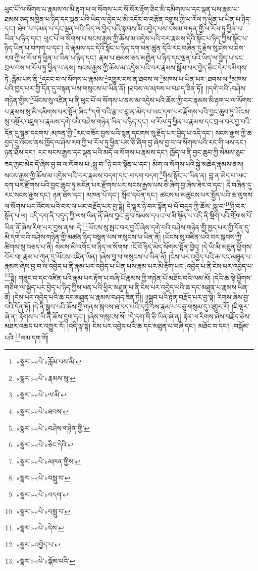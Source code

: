 ཕུང་པོ་ལ་སོགས་པ་རྣམས་ལ་མི་རྟག་པ་ལ་སོགས་པར་སོ་སོར་རྟོག་ཅིང་མི་དམིགས་པ་དང་ལྡན་པས་རྣམ་པ་ཐམས་ཅད་མཁྱེན་པ་ཉིད་དང་ལྡན་པའི་ཡིད་ལ་བྱེད་པ་མི་འདོར་བ་བརྩོན་འགྲུས་ཀྱི་ཕ་རོལ་ཏུ་ཕྱིན་པ་ཡིན་པ་ཉིད་དང་། ཐེག་པ་དམན་པ་དང་ལྡན་པའི་ཡིད་ལ་བྱེད་པའི་སྐབས་མི་འབྱེད་པས་བསམ་གཏན་གྱི་ཕ་རོལ་ཏུ་ཕྱིན་པ་ཡིན་པ་ཉིད་དང་། ཕུང་པོ་ལ་སོགས་པ་སངས་རྒྱས་ཀྱི་ཆོས་མ་འདྲེས་པའི་བར་རྣམས་དེའི་སྟོང་པ་ཉིད་ཀྱིས་སྟོང་པ་ཉིད་ཡིན་པ་བཀག་པ་དང་། དེ་རྣམས་དང་དེའི་སྟོང་པ་ཉིད་དག་ཕན་ཚུན་དེའི་རང་བཞིན་དུ་རྗེས་སུ་ཤེས་པ་ཤེས་རབ་ཀྱི་ཕ་རོལ་ཏུ་ཕྱིན་པ་ཡིན་པ་ཉིད་དང་། རྣམ་པ་ཐམས་ཅད་མཁྱེན་པ་ཉིད་དང་ལྡན་པའི་ཡིད་ལ་བྱེད་པ་དང་བྲལ་བས་ཕ་རོལ་ཏུ་ཕྱིན་པ་ནས། སངས་རྒྱས་ཀྱི་ཆོས་མ་འདྲེས་པའི་བར་རྣམས་སྒོམ་པར་བྱེད་ཅིང་དེར་དམིགས་ཏེ་:རློམ་པས་ནི་\footnote{«སྣར་»«པེ་»རློམ་པས་མི་}དངང་བ་ལ་སོགས་པ་རྣམས་\footnote{«སྣར་»«པེ་»རྣམས་སུ་}འགྱུར་བས་ན་ཐབས་ལ་\footnote{«སྣར་»«པེ་»ལ་མི་}མཁས་པ་ཡིན་པར་:ཐབས་ལ་\footnote{«སྣར་»«པེ་»ཐབས་}མཁས་པའི་ཁྱད་པར་གྱི་དོན་དུ་བསྟན་པས་གསུངས་པ་ཡིན་ནོ། །ཐབས་ལ་མཁས་པ་བཤད་ཟིན་ཏོ།། །།དགེ་བའི་:བཤེས་གཉེན་གྱིས་\footnote{«སྣར་»«པེ་»བཤེས་གཉེན་གྱི་}ཡོངས་སུ་འཛིན་པ་ནི་ཕུང་པོ་ལ་སོགས་པ་ནས་མ་འདྲེས་པའི་ཆོས་ཀྱི་བར་རྣམས་མི་རྟག་པ་ལ་སོགས་པ་རྣམས་སུ་མི་དམིགས་པར་སྟོན་ཞིང་\footnote{«སྣར་»«པེ་»ཅིང་དེའི་}དགེ་བའི་རྩ་བ་བླ་ན་མེད་པ་ཡང་དག་པར་རྫོགས་པའི་བྱང་ཆུབ་ཏུ་ཡོངས་སུ་བསྔོར་འཇུག་པ་རྣམས་དགེ་བའི་བཤེས་གཉེན་ཡིན་པ་ཉིད་དང་། ཕ་རོལ་ཏུ་ཕྱིན་པ་རྣམས་དང་བྲལ་བར་བྱ་བའི་དོན་དུ་སྙན་དངགས་:མཁན་གྱི་\footnote{«སྣར་»«པེ་»མཁན་གྱིས་}རང་བཟོར་བྱས་པའི་སྙན་དངགས་སུ་རྗོད་པར་བྱེད་པ་འདི་དང་། སངས་རྒྱས་ཀྱི་ཆ་བྱད་དུ་འོངས་ནས་ཁྱོད་ལ་ཤེས་རབ་ཀྱི་ཕ་རོལ་ཏུ་ཕྱིན་པས་ཅི་ཞིག་བྱ་ཞེས་བྱ་བ་ལ་སོགས་པའི་རང་གི་ལས་དང་། ཉན་ཐོས་དང་། རང་སངས་རྒྱས་དང་ལྡན་པའི་མདོ་ལ་སོགས་པ་རྣམས་དང་། ཁྱོད་ལ་ནི་བྱང་ཆུབ་ཀྱི་སེམས་ཅུང་ཟད་ཀྱང་མེད་དོ་ཞེས་བྱ་བ་ལ་སོགས་པ་:སླུ་བ་\footnote{«སྣར་»«པེ་»བསླུ་བ་}ཉེ་བར་སྟོན་པ་དང་། མིག་ལ་སོགས་པའི་སྐྱེ་མཆེད་རྣམས་ནས། སངས་རྒྱས་ཀྱི་ཆོས་མ་འདྲེས་པའི་བར་རྣམས་བདག་དང་:བདག་བདག་\footnote{«སྣར་»«པེ་»བདག་}གིས་སྟོང་པ་ཡིན་ན། བླ་ན་མེད་པ་ཡང་དག་པར་རྫོགས་པའི་བྱང་ཆུབ་ཏུ་མངོན་པར་རྫོགས་པར་སངས་རྒྱས་པས་ཅི་ཞིག་བྱ་ཞེས་ཟེར་བ་དང་། དེ་བཞིན་དུ་རང་སངས་རྒྱས་དང་། ཉན་ཐོས་དང་། མཁན་པོ་དང་། སློབ་དཔོན་དང་། ཚངས་པ་མཚུངས་པར་སྤྱོད་པའི་ཆ་ལུགས་ལ་སོགས་པར་འོངས་པའི་བར་ལ་ཡང་བརྗོད་པར་བྱ་སྟེ། དེ་ལྟར་ཉེ་བར་སྟོན་པ་པོ་བདུད་ཀྱི་ཆོས་:སླུ་བ་\footnote{«སྣར་»«པེ་»བསླུ་བ་}ཉེ་བར་སྟོན་པ་ལ། འདི་དག་ནི་བདུད་ཀྱི་ལས་ཡིན་ནོ་ཞེས་བྱང་ཆུབ་སེམས་དཔའ་ལ་མི་སྟོན་པ་འདི་ནི་སྡིག་པའི་གྲོགས་པོ་ཡིན་ནོ་ཞེས་རིག་པར་བྱས་ནས། དེ་\footnote{«སྣར་»«པེ་»དེས་}ཡོངས་སུ་སྤང་བར་བྱའོ་ཞེས་དགེ་བའི་བཤེས་གཉེན་གྱི་ཁྱད་པར་གྱི་དོན་དུ་མི་དགེ་བའི་བཤེས་གཉེན་གྱི་མཚན་ཉིད་བསྟན་པས་གསུངས་པ་ཡིན་ནོ། །ཡོངས་སུ་འཛིན་པའི་བར་སྐབས་ཀྱི་ཚིགས་སུ་བཅད་པ་ནི། སེམས་མི་འགོང་བ་ཉིད་ལ་སོགས། །ངོ་བོ་ཉིད་མེད་སོགས་སྟོན་བྱེད། །དེ་ཡི་མི་མཐུན་ཕྱོགས་བོར་བ། རྣམ་པ་ཀུན་དུ་ཡོངས་འཛིན་ཡིན། །ཞེས་བྱ་བ་གསུངས་པ་ཡིན་ནོ། །ངེས་པར་འབྱེད་པའི་ཆ་དང་མཐུན་པ་རྣམས་ཞེས་བྱ་བ་ལ་འབྱེད་པ་ནི་རྣམ་པར་འབྱེད་པ་ཡིན་པས་རྣམ་པར་མི་རྟོག་པར་:འབྱེད་པ་ནི་ངེས་པར་འབྱེད་པ་\footnote{«སྣར་»འབྱེད་པ་}སྟེ། གཟུང་བ་དང་འཛིན་པའི་རྣམ་པར་རྟོག་པ་བཞི་པོ་རྣམས་ཀྱི་གཉེན་པོ་མཐོང་བའི་ལམ་མོ། །དེའི་ཆ་སྟེ་ཕྱོགས་གཅིག་ལ་སྐྱེད་པར་བྱེད་པ་ཉིད་ཀྱིས་ཕན་པའི་ཕྱིར་མཐུན་པ་ནི་ངེས་པར་འབྱེད་པའི་ཆ་དང་མཐུན་པ་རྣམས་ཡིན་ནོ། །ངེས་པར་འབྱེད་པའི་ཆ་དང་མཐུན་པ་རྣམས་བཤད་ཟིན་ཏོ།། །།སྒྲུབ་པའི་རྟེན་བརྗོད་པར་བྱ་སྟེ། རིགས་ཞེས་བྱ་བའི་དོན་ཏོ། །དེ་ནི་སྒྲུབ་པའི་ཆོས་ཀྱི་གནས་སྐབས་ཐ་དད་པའི་དབྱེ་བས་རྣམ་པ་བཅུ་གསུམ་དུ་འགྱུར་རོ། །ཇི་ལྟར་ཞེ་ན། རྟོགས་པ་ཡི་ནི་ཆོས་དྲུག་དང་། །ཞེས་གསུངས་སོ། །དེ་དག་གི་ཅི་ཡིན་ཞེ་ན། རྟེན་ལ་རིགས་ཞེས་བརྗོད་ཅེས་མཐར་འཆད་པར་འགྱུར་རོ། །འདི་ལྟ་སྟེ། ངེས་པར་འབྱེད་པའི་ཆ་དང་མཐུན་པ་བཞི་དང་། མཐོང་བ་དང་། :བསྒོམ་པའི་\footnote{«སྣར་»«པེ་»སྒོམ་པའི་}ལམ་དག་གོ། 